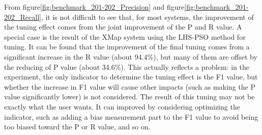 \documentclass[twoside]{article}
\begin{document}
From figure\ref{fig:benchmark_201-202_Precision} and figure\ref{fig:benchmark_201-202_Recall}, it is not difficult to see that, for most systems, the improvement of the tuning effect comes from the joint improvement of the P and R value.
A special case is the result of the XMap system using the LHS-PSO method for tuning. It can be found that the improvement of the final tuning comes from a significant increase in the R value (about 94.4\%), but many of them are offset by the reducing of P value (about 34.6\%).
This actually reflects a problem: in the experiment, the only indicator to determine the tuning effect is the F1 value, but whether the increase in F1 value will cause other impacts (such as making the P value significantly lower) is not considered. The result of this tuning may not be exactly what the user wants.
It can improved by considering optimizing the indicator, such as adding a bias measurement part to the F1 value to avoid being too biased toward the P or R value, and so on.
\end{document}
